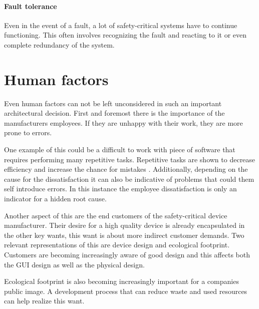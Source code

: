 \paragraph{Fault tolerance}
Even in the event of a fault, a lot of safety-critical systems have to continue functioning. This often involves recognizing the fault and reacting to it or even complete redundancy of the system.

\section{Human factors}
Even human factors can not be left unconsidered in such an important architectural decision. First and foremost there is the importance of the manufacturers employees. If they are unhappy with their work, they are more prone to errors.

One example of this could be a difficult to work with piece of software that requires performing many repetitive tasks. Repetitive tasks are shown to decrease efficiency and increase the chance for mistakes \cite{Wyatt.1937}. Additionally, depending on the cause for the dissatisfaction it can also be indicative of problems that could them self introduce errors. In this instance the employee dissatisfaction is only an indicator for a hidden root cause.

Another aspect of this are the end customers of the safety-critical device manufacturer. Their desire for a high quality device is already encapsulated in the other key wants, this want is about more indirect customer demands. Two relevant representations of this are device design and ecological footprint. Customers are becoming increasingly aware of good design \cite{HBR.September2015} and this affects both the \gls{GUI} design as well as the physical design. 

Ecological footprint is also becoming increasingly important for a companies public image. A development process that can reduce waste and used resources can help realize this want.

